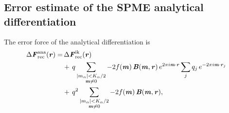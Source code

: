 \documentclass[journal=jacsat,manuscript=article]{achemso}
\renewcommand{\v}[1]{\textbf{\textit{#1}}}
\begin{document}
\subsection{Error estimate of the SPME analytical differentiation}
\label{sec:error-ana}

The error force of the analytical differentiation is 
\begin{align}\nonumber
  \Delta\v F_{\textrm{rec}}^{\textrm{ana}}(\v r)
  =&\,
  \Delta\v F_{\textrm{rec}}^{\textrm{ik}}(\v r)\\\nonumber
  & +\,
  q
  \sum_{
    \begin{subarray}{c}
      \vert m_{\alpha}\vert < K_\alpha/2\\
      \v m\neq 0
    \end{subarray}}
  -2f(\v m)\,
  \v B(\v m, \v r)\,e^{2\pi i\v m\cdot \v r}
  \sum_{j}q_j\,
  e^{-2\pi i\v m\cdot\v r_j} \\\label{eqn:ana.error.force}
  & +\,
  q^2
  \sum_{
    \begin{subarray}{c}
      \vert m_{\alpha}\vert < K_\alpha/2\\
      \v m\neq 0
    \end{subarray}}
  -2f(\v m)\,\v B(\v m, \v r),
\end{align}
\end{document}
